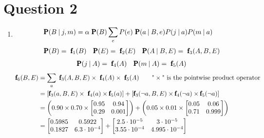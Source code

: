 \documentclass[a4paper, 12pt, one column, aas_macros]{article}
\newcommand\given[1][]{\:#1\vert\:}
\begin{document}
\section*{Question 2}
  \begin{enumerate}[label=\alph*]
      \item 
          \begin{align*}
              &\text{\pmb{P}}(B\given j, m) = \alpha \text{\pmb{ P}}(B)\sum_{e}P(e)\text{\pmb{ P}}(a \given B, e)P(j \given a)P(m \given a)
          \end{align*}
          \begin{align*}
          	\text{\pmb{P}}(B) = \text{ \pmb f}_{1}(B) \quad
            \text{\pmb{P}}(E) = \text{ \pmb f}_{2}(E) \quad
            \text{\pmb{P}}(A \given B, E) = \text{ \pmb f}_{3}(A, B, E)
          \end{align*}
          \begin{align*}
          	\text{\pmb{P}}(j\given A) = \text{ \pmb f}_{4}(A) \quad
            \text{\pmb{P}}(m \given A) = \text{ \pmb f}_{5}(A)
          \end{align*}
          \begin{align*}
          	 \text{\pmb f}_{6}(B, E) &= \sum_{a}\text{ \pmb f}_{3}(A, B, E)\times\text{ \pmb f}_{4}(A)\times\text{ \pmb f}_{5}(A) \qquad \text{"}\times\text{"} \text{ is the pointwise product operator} \\
             &= [\text{\pmb f}_{3}(a, B, E)\times\text{ \pmb f}_{4}(a)\times\text{\pmb f}_{5}(a)] + [\text{\pmb f}_{3}(\neg a, B, E)\times\text{\pmb f}_{4}(\neg a)\times\text{\pmb f}_{5}(\neg a)] \\
             &= \left(0.90 \times 0.70 \times \begin{bmatrix}
             0.95 & 0.94 \\ 0.29 & 0.001
             \end{bmatrix}\right) + \left(0.05 \times 0.01 \times \begin{bmatrix}
             0.05 & 0.06 \\ 0.71 & 0.999
             \end{bmatrix}\right) \\
             &= \begin{bmatrix}
             0.5985 & 0.5922 \\ 0.1827 & 6.3\cdot10^{-4}
             \end{bmatrix} + \begin{bmatrix}
             2.5 \cdot 10^{-5} & 3 \cdot 10^{-5} \\ 3.55 \cdot 10^{-4} & 4.995 \cdot 10^{-4}

\end{bmatrix}
\end{align*}
\end{enumerate}
\end{document}
